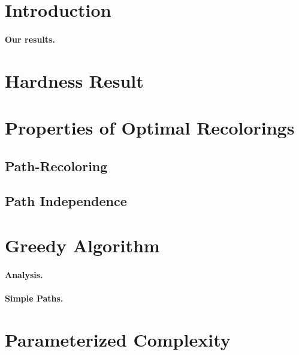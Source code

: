 

\section{Introduction}

	
\paragraph*{\bf Our results.}


\section{Hardness Result}



\section{Properties of Optimal Recolorings}

	
	\subsection{Path-Recoloring}
	
	
	\subsection{Path Independence}
	


\section{Greedy Algorithm}




\paragraph*{\bf Analysis.}


\paragraph*{\bf Simple Paths.}


\section{Parameterized Complexity}
